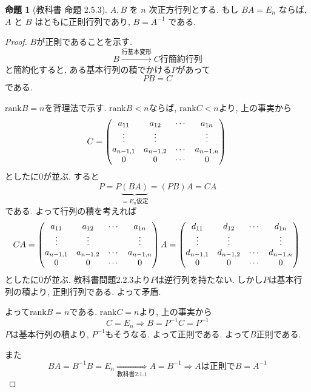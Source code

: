 \documentclass[dvipdfmx,a4paper,11pt]{article} %
\newcommand{\En}{E_n}
\theoremstyle{definition}
\newtheorem{prop}[thm]{命題}
\begin{document}
\begin{prop}[教科書 命題 2.5.3]
$A,B$ を $n$ 次正方行列とする. もし
\(
BA=\En
\)
ならば, $A$ と $B$ はともに正則行列であり,
\(
B=A^{-1}
\)
である.
\end{prop}
\begin{proof}
$B$が正則であることを示す. 
$$
B\overset{\text{行基本変形}}{\longrightarrow} C \text{行簡約行列}
$$
と簡約化すると, ある基本行列の積でかける$P$があって
$$
PB=C
$$
である. 

$\mathrm{rank}B=n$を背理法で示す. 
$\mathrm{rank}B<n$ならば, $\mathrm{rank}C<n$より, 上の事実から
$$
C=
\begin{pmatrix}
a_{11} & a_{12} & \cdots & a_{1n} \\
\vdots & \vdots & & \vdots \\
a_{n-1,1} & a_{n-1,2} & \cdots & a_{n-1,n} \\
0& 0 & \cdots & 0
\end{pmatrix}\\
$$
としたに0が並ぶ. 
すると
$$
P = P\underbrace{(BA)}_{=E_n \text{仮定}}
=(PB)A
=CA
$$
である. 
よって行列の積を考えれば
$$
CA = \begin{pmatrix}
a_{11} & a_{12} & \cdots & a_{1n} \\
\vdots & \vdots & & \vdots \\
a_{n-1,1} & a_{n-1,2} & \cdots & a_{n-1,n} \\
0& 0 & \cdots & 0
\end{pmatrix}\\ A
=
\begin{pmatrix}
d_{11} & d_{12} & \cdots & d_{1n} \\
\vdots & \vdots & & \vdots \\
d_{n-1,1} & d_{n-1,2} & \cdots & d_{n-1,n} \\
0& 0 & \cdots & 0
\end{pmatrix}\\ 
$$
としたに0が並ぶ. 教科書問題2.2.3より$P$は逆行列を持たない. 
しかし$P$は基本行列の積より, 正則行列である. よって矛盾.

よって$\mathrm{rank}B=n$である. 
$\mathrm{rank}C=n$より, 上の事実から
$$
C=E_n 
\Rightarrow
B=P^{-1}C=P^{-1}
$$
$P$は基本行列の積より, $P^{-1}$もそうなる. よって正則である. 
よって$B$正則である. 

また
$$
BA = B^{-1}B=E_n 
\underset{\text{教科書2.1.1}}{\Rightarrow}
A=B^{-1}
\Rightarrow
\text{$A$は正則で}B=A^{-1}
$$ 
\end{proof}
\end{document}
